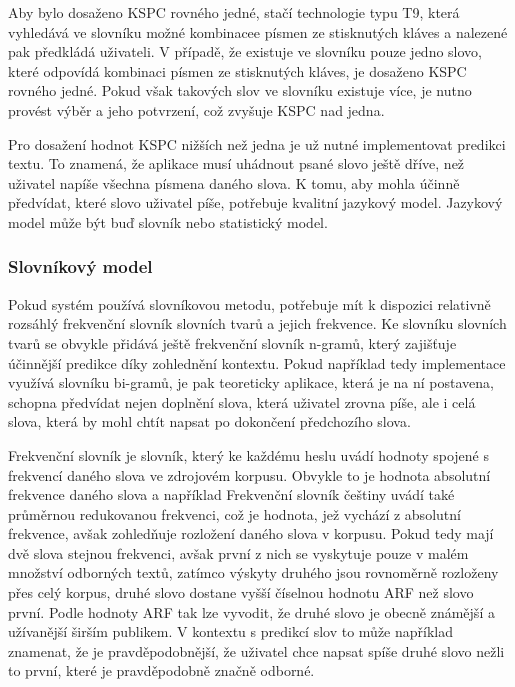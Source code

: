 \documentclass{article}
\begin{document}
Aby bylo dosaženo KSPC rovného jedné, stačí technologie typu T9, která vyhledává ve slovníku možné kombinacee písmen ze stisknutých kláves a nalezené pak předkládá uživateli. V případě, že existuje ve slovníku pouze jedno slovo, které odpovídá kombinaci písmen ze stisknutých kláves, je dosaženo KSPC rovného jedné. Pokud však takových slov ve slovníku existuje více, je nutno provést výběr a jeho potvrzení, což zvyšuje KSPC nad jedna.

Pro dosažení hodnot KSPC nižších než jedna je už nutné implementovat predikci textu. To znamená, že aplikace musí uhádnout psané slovo ještě dříve, než uživatel napíše všechna písmena daného slova. K tomu, aby mohla účinně předvídat, které slovo uživatel píše, potřebuje kvalitní jazykový model. Jazykový model může být buď slovník nebo statistický model. 

\subsubsection{Slovníkový model}

Pokud systém používá slovníkovou metodu, potřebuje mít k dispozici relativně rozsáhlý frekvenční slovník slovních tvarů a jejich frekvence. Ke slovníku slovních tvarů se obvykle přidává ještě frekvenční slovník n-gramů, který zajišťuje účinnější predikce díky zohlednění kontextu. Pokud například tedy implementace využívá slovníku bi-gramů, je pak teoreticky aplikace, která je na ní postavena, schopna předvídat nejen doplnění slova, která uživatel zrovna píše, ale i celá slova, která by mohl chtít napsat po dokončení předchozího slova.

Frekvenční slovník je slovník, který ke každému heslu uvádí hodnoty spojené s frekvencí daného slova ve zdrojovém korpusu. Obvykle to je hodnota absolutní frekvence daného slova a například Frekvenční slovník češtiny %
uvádí také průměrnou redukovanou frekvenci, což je hodnota, jež vychází z absolutní frekvence, avšak zohledňuje rozložení daného slova v korpusu. Pokud tedy mají dvě slova stejnou frekvenci, avšak první z nich se vyskytuje pouze v malém množství odborných textů, zatímco výskyty druhého jsou rovnoměrně rozloženy přes celý korpus, druhé slovo dostane vyšší číselnou hodnotu ARF než slovo první. Podle hodnoty ARF tak lze vyvodit, že druhé slovo je obecně známější a užívanější širším publikem. %
V kontextu s predikcí slov to může například znamenat, že je pravděpodobnější, že uživatel chce napsat spíše druhé slovo nežli to první, které je pravděpodobně značně odborné.
\end{document}
